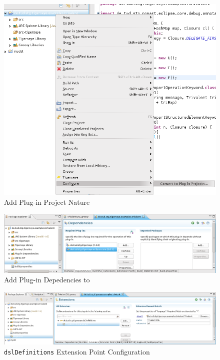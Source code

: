   	\begin{figure}
	  \centering
	  \includegraphics[width=.5\textwidth,keepaspectratio=true]{./pics/example_deploy_converttoplugin.png}
	  \caption{Add Plug-in Project Nature}\label{fig:example_deploy_converttoplugin}
	\end{figure}
	 
	\begin{figure}
	  \centering
	  \includegraphics[width=\textwidth,keepaspectratio=true]{./pics/example_deploy_addplugindependencies.png}
	  \caption{Add Plug-in Depedencies to \tiger}\label{fig:example_deploy_addplugindependencies}
	\end{figure}
	
		\begin{figure}
	  \centering
	  \includegraphics[width=\textwidth,keepaspectratio=true]{./pics/example_deploy_extensionpoint.png}
	  \caption{\texttt{dslDefinitions} Extension Point Configuration}\label{fig:example_deploy_extensionpoint}
	\end{figure} 
